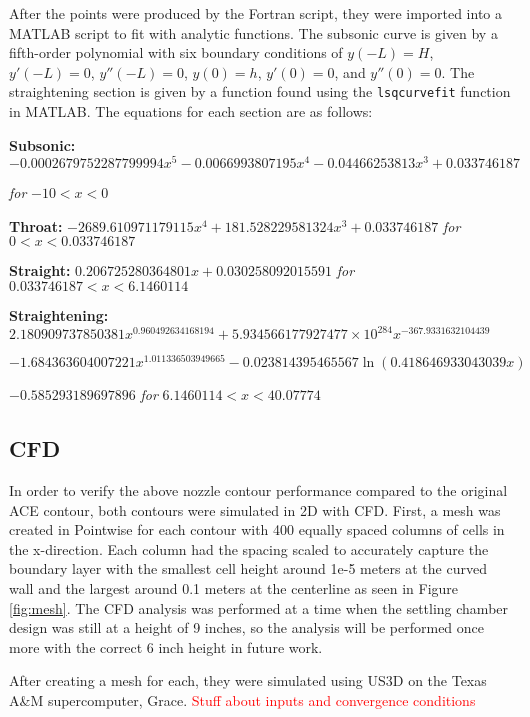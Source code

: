 After the points were produced by the Fortran script, they were imported into a MATLAB script to fit with analytic functions. The subsonic curve is given by a fifth-order polynomial with six boundary conditions of $y(-L)=H$, $y'(-L)=0$, $y''(-L)=0$, $y(0)=h$, $y'(0)=0$, and $y''(0)=0$. The straightening section is given by a function found using the \texttt{lsqcurvefit} function in MATLAB. The equations for each section are as follows:

{\fontsize{10.5}{15}\selectfont
\textbf{Subsonic:} $-0.0002679752287799994x^5 - 0.0066993807195x^4 - 0.04466253813x^3 + 0.033746187$ 

\qquad \qquad \quad \textit{for} $-10 < x < 0$

\textbf{Throat:} $-2689.610971179115x^4 + 181.528229581324x^3 + 0.033746187$ \textit{for} $0 < x < 0.033746187$

\textbf{Straight:} $0.206725280364801x + 0.030258092015591$ \textit{for} $0.033746187 < x < 6.1460114$

\textbf{Straightening:} $2.180909737850381x^{0.960492634168194} + 5.934566177927477 \times 10^{284} x^{-367.9331632104439}$ 

\qquad \qquad \qquad $- 1.684363604007221x^{1.011336503949665} - 0.023814395465567 \ln(0.418646933043039x)$

\qquad \qquad \qquad $- 0.585293189697896$ \textit{for} $6.1460114 < x < 40.07774$
}

\subsection{CFD}

In order to verify the above nozzle contour performance compared to the original ACE contour, both contours were simulated in 2D with CFD. First, a mesh was created in Pointwise for each contour with 400 equally spaced columns of cells in the x-direction. Each column had the spacing scaled to accurately capture the boundary layer with the smallest cell height around 1e-5 meters at the curved wall and the largest around 0.1 meters at the centerline as seen in Figure \ref{fig:mesh}. The CFD analysis was performed at a time when the settling chamber design was still at a height of 9 inches, so the analysis will be performed once more with the correct 6 inch height in future work.

After creating a mesh for each, they were simulated using US3D on the Texas A\&M supercomputer, Grace. \textcolor{red}{Stuff about inputs and convergence conditions}


